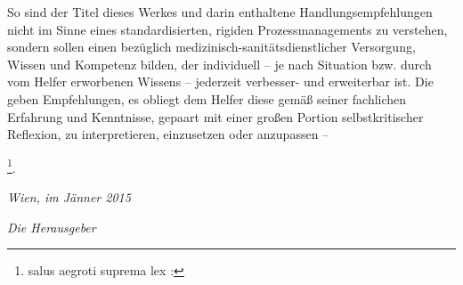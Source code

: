 {So sind der Titel dieses Werkes 
und darin enthaltene Handlungsempfehlungen 
nicht im Sinne eines standardisierten, 
rigiden Prozessmanagements zu verstehen,
sondern sollen einen  bezüglich
medizinisch-sanitätsdienstlicher Versorgung, 
Wissen und
Kompetenz bilden, 
der individuell 
-- je nach Situation 
bzw. durch vom Helfer erworbenen Wissens -- 
jederzeit verbesser- und erweiterbar ist. 
%
Die {\AASS} geben Empfehlungen, 
es obliegt dem Helfer diese gemäß seiner 
fachlichen Erfahrung und Kenntnisse,
gepaart mit einer großen Portion selbstkritischer Reflexion, 
zu interpretieren, 
einzusetzen 
oder anzupassen -- 


\footnote{salus aegroti suprema lex : }.

\bigskip

\bigskip

\begin{flushright}

\emph{Wien, im Jänner 2015}

\bigskip

\emph{Die Herausgeber}
\end{flushright}

\normalfont
}

